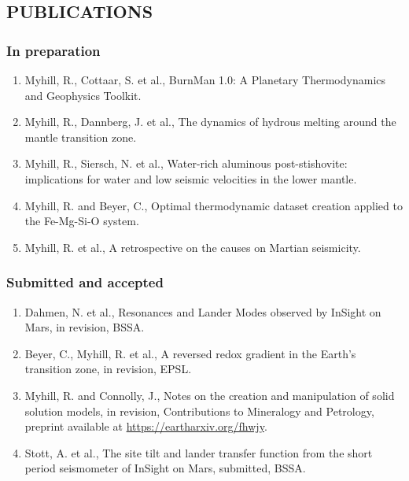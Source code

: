 \documentclass[11pt,twoside,a4paper]{article}
\begin{document}
\clearpage
\subsection*{PUBLICATIONS}
\subsubsection*{In preparation}
\small \sloppy
\begin{enumerate}
\item Myhill, R., Cottaar, S. et al., BurnMan 1.0: A Planetary Thermodynamics and Geophysics Toolkit.
\item Myhill, R., Dannberg, J. et al., The dynamics of hydrous melting around the mantle transition zone.
\item Myhill, R., Siersch, N. et al., Water-rich aluminous post-stishovite: implications for water and low seismic velocities in the lower mantle.
\item Myhill, R. and Beyer, C., Optimal thermodynamic dataset creation applied to the Fe-Mg-Si-O system.
\item Myhill, R. et al., A retrospective on the causes on Martian seismicity.
\end{enumerate}

\subsubsection*{Submitted and accepted}
\begin{enumerate}
  \item Dahmen, N. et al., Resonances and Lander Modes observed by InSight on Mars, in revision, BSSA.
  \item Beyer, C., Myhill, R. et al., A reversed redox gradient in the Earth's transition zone, in revision, EPSL.
  \item Myhill, R. and Connolly, J., Notes on the creation and manipulation of solid solution models, in revision, Contributions to Mineralogy and Petrology, preprint available at \href{https://eartharxiv.org/fhwjy}{https://eartharxiv.org/fhwjy}.
  \item Stott, A. et al., The site tilt and lander transfer function from the short period seismometer of InSight on Mars, submitted, BSSA.
\end{enumerate}
\end{document}
